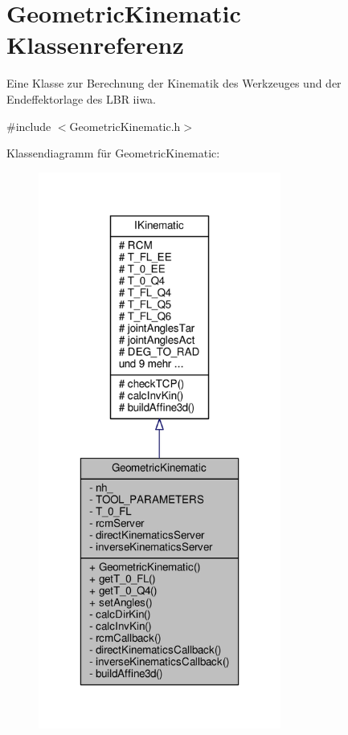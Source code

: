 \hypertarget{classGeometricKinematic}{\section{Geometric\-Kinematic Klassenreferenz}
\label{classGeometricKinematic}
}


Eine Klasse zur Berechnung der Kinematik des Werkzeuges und der Endeffektorlage des L\-B\-R iiwa.  




{\ttfamily \#include $<$Geometric\-Kinematic.\-h$>$}



Klassendiagramm für Geometric\-Kinematic\-:
\nopagebreak
\begin{figure}[H]
\begin{center}
\leavevmode
\includegraphics[width=226pt]{classGeometricKinematic__inherit__graph}
\end{center}
\end{figure}


